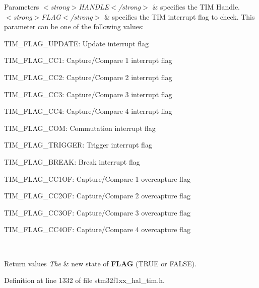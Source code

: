 \begin{DoxyParams}{Parameters}
{\em $<$strong$>$\+H\+A\+N\+D\+L\+E$<$/strong$>$} & specifies the T\+IM Handle. \\
\hline
{\em $<$strong$>$\+F\+L\+A\+G$<$/strong$>$} & specifies the T\+IM interrupt flag to check. This parameter can be one of the following values\+: \begin{DoxyItemize}
\item T\+I\+M\+\_\+\+F\+L\+A\+G\+\_\+\+U\+P\+D\+A\+TE\+: Update interrupt flag \item T\+I\+M\+\_\+\+F\+L\+A\+G\+\_\+\+C\+C1\+: Capture/\+Compare 1 interrupt flag \item T\+I\+M\+\_\+\+F\+L\+A\+G\+\_\+\+C\+C2\+: Capture/\+Compare 2 interrupt flag \item T\+I\+M\+\_\+\+F\+L\+A\+G\+\_\+\+C\+C3\+: Capture/\+Compare 3 interrupt flag \item T\+I\+M\+\_\+\+F\+L\+A\+G\+\_\+\+C\+C4\+: Capture/\+Compare 4 interrupt flag \item T\+I\+M\+\_\+\+F\+L\+A\+G\+\_\+\+C\+OM\+: Commutation interrupt flag \item T\+I\+M\+\_\+\+F\+L\+A\+G\+\_\+\+T\+R\+I\+G\+G\+ER\+: Trigger interrupt flag \item T\+I\+M\+\_\+\+F\+L\+A\+G\+\_\+\+B\+R\+E\+AK\+: Break interrupt flag \item T\+I\+M\+\_\+\+F\+L\+A\+G\+\_\+\+C\+C1\+OF\+: Capture/\+Compare 1 overcapture flag \item T\+I\+M\+\_\+\+F\+L\+A\+G\+\_\+\+C\+C2\+OF\+: Capture/\+Compare 2 overcapture flag \item T\+I\+M\+\_\+\+F\+L\+A\+G\+\_\+\+C\+C3\+OF\+: Capture/\+Compare 3 overcapture flag \item T\+I\+M\+\_\+\+F\+L\+A\+G\+\_\+\+C\+C4\+OF\+: Capture/\+Compare 4 overcapture flag \end{DoxyItemize}
\\
\hline
\end{DoxyParams}

\begin{DoxyRetVals}{Return values}
{\em The} & new state of {\bfseries F\+L\+AG} (T\+R\+UE or F\+A\+L\+SE). \\
\hline
\end{DoxyRetVals}


Definition at line 1332 of file stm32f1xx\+\_\+hal\+\_\+tim.\+h.

\mbox{\label{group___t_i_m___exported___macros_gabfeec6b3c67a5747c7dbd20aff61d8e2}} 
